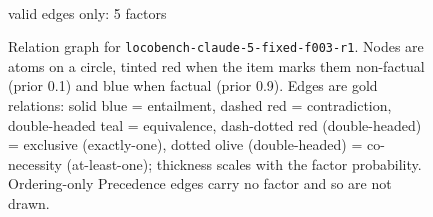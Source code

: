 \documentclass[11pt]{article}
\begin{document}
\begin{figure}[htbp]
\begin{minipage}[t]{0.48\linewidth}
{
}
\\[2pt]{\footnotesize valid edges only: 5 factors}
\end{minipage}
\caption{Relation graph for \texttt{locobench-claude-5-fixed-f003-r1}. Nodes are atoms on a circle, tinted red when the item marks them non-factual (prior 0.1) and blue when factual (prior 0.9). Edges are gold relations: solid blue = entailment, dashed red = contradiction, double-headed teal = equivalence, dash-dotted red (double-headed) = exclusive (exactly-one), dotted olive (double-headed) = co-necessity (at-least-one); thickness scales with the factor probability. Ordering-only Precedence edges carry no factor and so are not drawn.}
\label{fig:graph-locobench-claude-5-fixed-f003-r1}
\end{figure}
\end{document}
